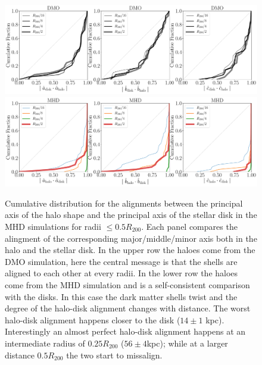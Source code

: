 \documentclass[a4paper,fleqn,usenatbib]{mnras}
\begin{document}
\begin{figure}
\begin{center}
\includegraphics[width=1.0\textwidth]{cumulative_alignment_DM.pdf}
\includegraphics[width=1.0\textwidth]{cumulative_alignment_MHD.pdf}
\end{center}
\caption{Cumulative distribution for the alignments between the
  principal axis of the halo shape and the principal axis of the
  stellar disk in the MHD simulations for radii $\leq 0.5R_{200}$.
  Each panel compares the alingment of the corresponding
  major/middle/minor axis both in the halo and the stellar disk.
  In the upper row the haloes come from the DMO simulation, 
  here the central message is that the shells are aligned to each
  other at every radii.
  In the lower row the haloes come from the MHD simulation and is a
  self-consistent comparison with the disks. 
  In this case the dark matter shells twist and  the degree of the
  halo-disk alignment changes with distance.
  The worst halo-disk alignment happens closer to the disk ($14\pm1$ kpc).
  Interestingly an almost perfect halo-disk alignment happens at an intermediate
  radius of $0.25R_{200}$ ($56\pm 4$kpc); while at a larger
  distance $0.5R_{200}$ the two start to missalign.
}
\label{fig:cumulative_alignment}
\end{figure}
\end{document}
